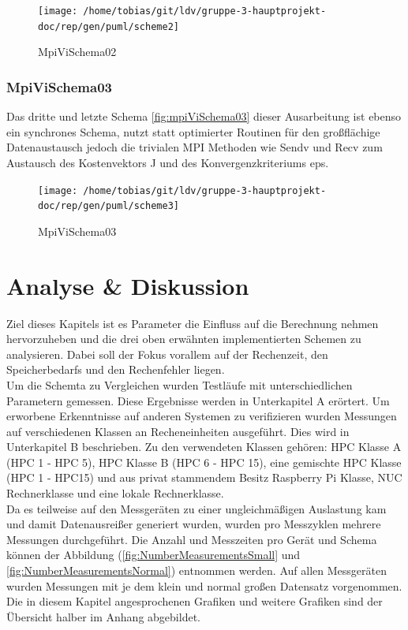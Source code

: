 \begin{figure}[h]
	\centering
	\texttt{[image: /home/tobias/git/ldv/gruppe-3-hauptprojekt-doc/rep/gen/puml/scheme2]}
	\caption{MpiViSchema02}
	\label{fig:mpiViSchema02}
\end{figure}

\subsubsection{MpiViSchema03}
Das dritte und letzte Schema \autoref{fig:mpiViSchema03} dieser Ausarbeitung ist ebenso ein synchrones Schema, nutzt statt optimierter Routinen für den großflächige Datenaustausch jedoch die trivialen MPI Methoden wie Sendv und Recv zum Austausch des Kostenvektors J und des Konvergenzkriteriums eps.

\begin{figure}[h]
	\centering
	\texttt{[image: /home/tobias/git/ldv/gruppe-3-hauptprojekt-doc/rep/gen/puml/scheme3]}
	\caption{MpiViSchema03}
	\label{fig:mpiViSchema03}
\end{figure}

\section{Analyse \& Diskussion}
\label{sec:analyse_diskussion}
Ziel dieses Kapitels ist es Parameter die Einfluss auf die Berechnung nehmen hervorzuheben und die drei oben erw\"ahnten implementierten Schemen zu analysieren. Dabei soll der Fokus vorallem auf der Rechenzeit, den Speicherbedarfs und den Rechenfehler liegen. \\ Um die  Schemta zu Vergleichen wurden Testl\"aufe mit unterschiedlichen Parametern gemessen. Diese Ergebnisse werden in Unterkapitel A er\"ortert. Um erworbene Erkenntnisse auf anderen Systemen zu verifizieren wurden Messungen auf verschiedenen Klassen an Recheneinheiten ausgef\"uhrt. Dies wird in Unterkapitel B beschrieben. Zu den verwendeten Klassen geh\"oren: HPC Klasse A (HPC 1 - HPC 5), HPC Klasse B (HPC 6 - HPC 15), eine gemischte HPC Klasse (HPC 1 - HPC15) und aus privat stammendem Besitz  Raspberry Pi Klasse, NUC Rechnerklasse und eine lokale Rechnerklasse. \\ Da es teilweise auf den Messger\"aten zu einer ungleichm\"a\ss{}igen Auslastung kam und damit Datenausrei\ss{}er generiert wurden, wurden pro Messzyklen mehrere Messungen durchgef\"uhrt. Die Anzahl und Messzeiten pro Ger\"at und Schema k\"onnen der Abbildung (\ref{fig:NumberMeasurementsSmall} und \ref{fig:NumberMeasurementsNormal}) entnommen werden. Auf allen Messger\"aten wurden Messungen mit je dem klein und normal gro\ss{}en Datensatz vorgenommen. Die in diesem Kapitel angesprochenen Grafiken und weitere Grafiken sind der \"Ubersicht halber im Anhang abgebildet.

